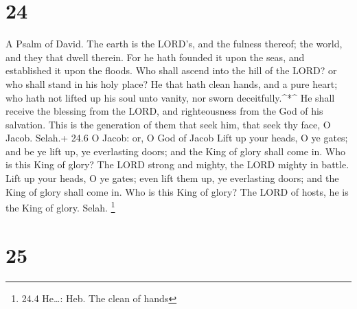 \hypertarget{section-23}{%
\section{24}\label{section-23}}

A Psalm of David.  The earth is the LORD's, and the fulness
thereof; the world, and they that dwell therein.  For he
hath founded it upon the seas, and established it upon the floods.
 Who shall ascend into the hill of the LORD? or who shall
stand in his holy place?  He that hath clean hands, and a
pure heart; who hath not lifted up his soul unto vanity, nor sworn
deceitfully.\^{}*\^{}  He shall receive the blessing from
the LORD, and righteousness from the God of his salvation. 
This is the generation of them that seek him, that seek thy face, O
Jacob. Selah.+ 24.6 O Jacob: or, O God of Jacob  Lift up
your heads, O ye gates; and be ye lift up, ye everlasting doors; and the
King of glory shall come in.  Who is this King of glory? The
LORD strong and mighty, the LORD mighty in battle.  Lift up
your heads, O ye gates; even lift them up, ye everlasting doors; and the
King of glory shall come in.  Who is this King of glory?
The LORD of hosts, he is the King of glory. Selah. \footnote{24.4
  He\ldots: Heb. The clean of hands}

\hypertarget{section-24}{%
\section{25}\label{section-24}}

